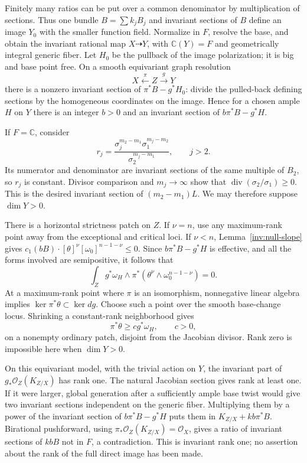 Finitely many ratios can be put over a common denominator by
multiplication of sections.  Thus one bundle $B=\sum k_jB_j$ and
invariant sections of $B$ define an image $Y_0$ with the smaller
function field.  Normalize in $F$, resolve the base, and obtain the
invariant rational map $X\dashrightarrow Y$, with
$\mathbb C(Y)=F$ and geometrically integral generic fiber.
Let $H_0$ be the pullback of the image polarization; it is big and
base point free.  On a smooth equivariant graph resolution
\[
 X\xleftarrow{\ \pi\ }Z\xrightarrow{\ g\ }Y
\]
there is a nonzero invariant section of
$\pi^*B-g^*H_0$: divide the pulled-back defining sections by the
homogeneous coordinates on the image.  Hence for a chosen ample $H$
on $Y$ there is an integer $b>0$ and an invariant section of
$b\pi^*B-g^*H$.

If $F=\mathbb C$, consider
\begin{equation}\label{inv:ratio-identity}
 r_j=\frac{\sigma_j^{m_2-m_1}\sigma_1^{m_j-m_2}}
                 {\sigma_2^{m_j-m_1}},\qquad j>2.
\end{equation}
Its numerator and denominator are invariant sections of the same
multiple of $B_2$, so $r_j$ is constant.  Divisor comparison and
$m_j\to\infty$ show that
$\operatorname{div}(\sigma_2/\sigma_1)\ge0$.  This is the desired
invariant section of $(m_2-m_1)L$.  We may therefore suppose
$\dim Y>0$.

There is a horizontal strictness patch on $Z$.  If $\nu=n$, use any
maximum-rank point away from the exceptional and critical loci.
If $\nu<n$, Lemma~\ref{inv:null-slope} gives
$c_1(bB)\cdot[\theta]^\nu[\omega_0]^{n-1-\nu}\le0$.
Since $b\pi^*B-g^*H$ is effective, and all the forms involved are
semipositive, it follows that
\[
 \int_Z g^*\omega_H\wedge
           \pi^*(\theta^\nu\wedge\omega_0^{n-1-\nu})=0.
\]
At a maximum-rank point where $\pi$ is an isomorphism, nonnegative
linear algebra implies $\ker\pi^*\theta\subset\ker dg$.
Choose such a point over the smooth base-change locus.  Shrinking a
constant-rank neighborhood gives
\begin{equation}\label{inv:horizontal-patch}
 \pi^*\theta\ge c g^*\omega_H,\qquad c>0,
\end{equation}
on a nonempty ordinary patch, disjoint from the Jacobian divisor.
Rank zero is impossible here when $\dim Y>0$.

On this equivariant model, with the trivial action on $Y$, the invariant
part of $g_*\mathcal O_Z(K_{Z/X})$ has rank one.  The natural Jacobian
section gives rank at least one.  If it were larger, global generation
after a sufficiently ample base twist would give two invariant
sections independent on the generic fiber.  Multiplying them by a
power of the invariant section of $b\pi^*B-g^*H$ puts them in
$K_{Z/X}+k b\pi^*B$.  Birational pushforward, using
$\pi_*\mathcal O_Z(K_{Z/X})=\mathcal O_X$, gives a ratio of
invariant sections of $kbB$ not in $F$, a contradiction.
This is invariant rank one; no assertion about the rank of the full
direct image has been made.

